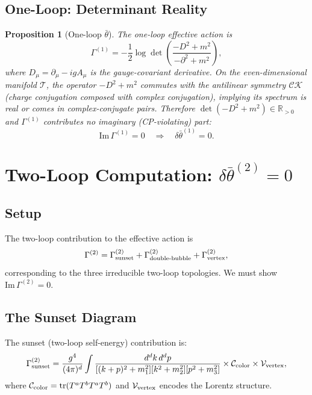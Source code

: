 \documentclass[11pt,a4paper]{article}
\newtheorem{proposition}[theorem]{Proposition}
\theoremstyle{remark}
\newcommand{\tr}{\operatorname{tr}}
\begin{document}
\subsection{One-Loop: Determinant Reality}

\begin{proposition}[One-loop $\bar\theta$]
\label{prop:oneloop}
The one-loop effective action is
\begin{equation}
\Gamma^{(1)} = -\frac{1}{2}\log\det\!\left(\frac{-D^2 + m^2}{-\partial^2 + m^2}\right),
\end{equation}
where $D_\mu = \partial_\mu - ig A_\mu$ is the gauge-covariant derivative.
On the even-dimensional manifold $\mathcal{T}$, the operator $-D^2 + m^2$
commutes with the antilinear symmetry $\mathcal{C}\mathcal{K}$ (charge
conjugation composed with complex conjugation), implying its spectrum is
real or comes in complex-conjugate pairs. Therefore
$\det(-D^2 + m^2) \in \mathbb{R}_{>0}$ and $\Gamma^{(1)}$ contributes
no imaginary (CP-violating) part:
\begin{equation}
\mathrm{Im}\,\Gamma^{(1)} = 0 \quad\Longrightarrow\quad \delta\bar\theta^{(1)} = 0.
\end{equation}
\end{proposition}

\section{Two-Loop Computation: $\delta\bar\theta^{(2)} = 0$}

\subsection{Setup}

The two-loop contribution to the effective action is
\begin{equation}
\Gamma^{(2)} = \Gamma^{(2)}_{\rm sunset} + \Gamma^{(2)}_{\rm double\text{-}bubble}
  + \Gamma^{(2)}_{\rm vertex},
\end{equation}
corresponding to the three irreducible two-loop topologies. We must show
$\mathrm{Im}\,\Gamma^{(2)} = 0$.

\subsection{The Sunset Diagram}

The sunset (two-loop self-energy) contribution is:
\begin{equation}
\Gamma^{(2)}_{\rm sunset} = \frac{g^4}{(4\pi)^{d}} \int \frac{d^dk\,d^dp}{[(k+p)^2+m_1^2][k^2+m_2^2][p^2+m_3^2]}
 \times \mathcal{C}_{\rm color} \times \mathcal{V}_{\rm vertex},
\end{equation}
where $\mathcal{C}_{\rm color} = \tr(T^a T^b T^a T^b)$ and
$\mathcal{V}_{\rm vertex}$ encodes the Lorentz structure.
\end{document}
